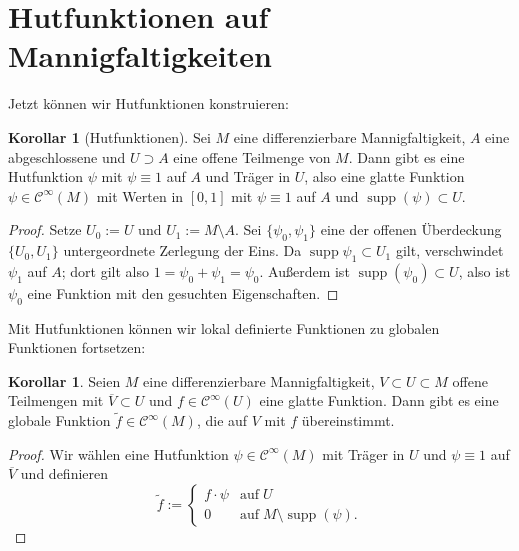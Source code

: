 \documentclass[a4paper]{scrreprt}
\numberwithin{equation}{chapter}
\DeclareMathOperator{\supp}{supp}
\newcommand{\sC}{\mathcal{C}^{\infty}}
\theoremstyle{definition}
\newtheorem{kor}[defn]{Korollar}
\begin{document}
\section{Hutfunktionen auf Mannigfaltigkeiten}
Jetzt können wir Hutfunktionen konstruieren:
\begin{kor}[Hutfunktionen]
	Sei $M$ eine differenzierbare Mannigfaltigkeit, $A$ eine abgeschlossene und $U \supset A$ eine offene Teilmenge von $M$. Dann gibt es eine Hutfunktion $\psi$ mit $\psi \equiv 1$ auf $A$ und Träger in $U$, also eine glatte Funktion $\psi \in \sC(M)$ mit Werten in $[0,1]$ mit $\psi \equiv 1$ auf $A$ und $\supp(\psi) \subset U$.

	\begin{proof}
		Setze $U_0 := U$ und $U_1 := M \setminus A$. Sei $\{\psi_0, \psi_1\}$ eine der offenen Überdeckung $\{U_0, U_1\}$ untergeordnete Zerlegung der Eins. Da $\supp{\psi_1} \subset U_1$ gilt, verschwindet $\psi_1$ auf $A$; dort gilt also $1 = \psi_0 + \psi_1 = \psi_0$. Außerdem ist $\supp(\psi_0) \subset U$, also ist $\psi_0$ eine Funktion mit den gesuchten Eigenschaften.
	\end{proof}
\end{kor}

Mit Hutfunktionen können wir lokal definierte Funktionen zu globalen Funktionen fortsetzen:
\begin{kor}
	Seien $M$ eine differenzierbare Mannigfaltigkeit, $V \subset U \subset M$ offene Teilmengen mit $\overline{V} \subset U$ und $f \in \sC(U)$ eine glatte Funktion. Dann gibt es eine globale Funktion $\tilde f \in \sC(M)$, die auf $V$ mit $f$ übereinstimmt.

	\begin{proof}
		Wir wählen eine Hutfunktion $\psi \in \sC(M)$ mit Träger in $U$ und $\psi \equiv 1$ auf $\overline{V}$ und definieren
		\[\tilde f := \begin{cases}
		f \cdot \psi & \text{auf} \; U\\
		0 & \text{auf} \; M \setminus \supp(\psi).
		\end{cases}\]
	\end{proof}
\end{kor}
\end{document}
